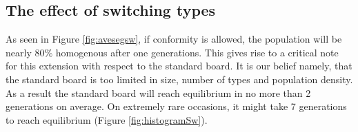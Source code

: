\subsection{The effect of switching types}
As seen in Figure \ref{fig:avesegsw}, if conformity is allowed, the population will be nearly \(80\%\) homogenous after one generations. 
This gives rise to a critical note for this extension with respect to the standard board. It is our belief namely, that the standard board is too limited in size, number of types and population density. 
As a result the standard board will reach equilibrium in no more than 2 generations on average. On extremely rare occasions, it might take 7 generations to reach equilibrium (Figure  \ref{fig:histogramSw}). 

  